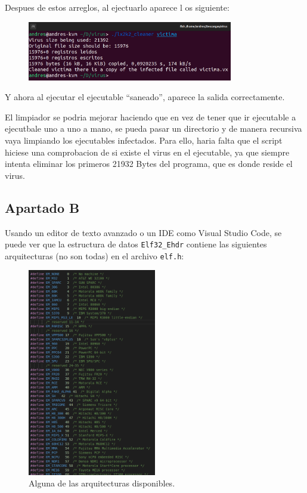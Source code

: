 \documentclass{article}
\begin{document}
Despues de estos arreglos, al ejectuarlo aparece l os siguiente:

\begin{figure}[H]
    \centering
    \includegraphics[width=0.8\textwidth]{imagenes/Captura desde 2022-11-23 12-45-50.png}
\end{figure}

Y ahora al ejecutar el ejecutable ``saneado'', aparece la salida correctamente.

\bigskip

El limpiador se podria mejorar haciendo que en vez de tener que ir ejecutable a ejecutbale uno a uno a mano, se pueda pasar un directorio y de manera recursiva vaya limpiando los ejecutables infectados. Para ello, haria falta que el script hiciese una comprobacion de si existe el virus en el ejecutable, ya que siempre intenta eliminar los primeros 21932 Bytes del programa, que es donde reside el virus.

\subsection*{Apartado B}

Usando un editor de texto avanzado o un IDE como Visual Studio Code, se puede ver que la estructura de datos \verb|Elf32_Ehdr| contiene las siguientes arquitecturas (no son todas) en el archivo \verb|elf.h|:

\begin{figure}[H]
    \centering
    \includegraphics[width=0.5\textwidth]{imagenes/Captura desde 2022-11-23 13-07-09.png}
    \caption{Alguna de las arquitecturas disponibles.}
\end{figure}
\end{document}
